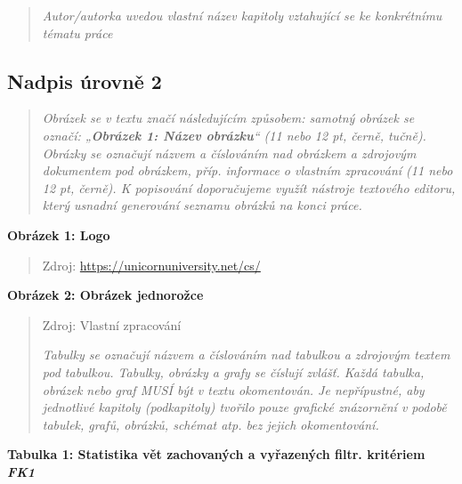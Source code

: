 \documentclass[
]{article}
\begin{document}
\begin{quote}
  \emph{Autor/autorka uvedou vlastní název kapitoly vztahující se ke
    konkrétnímu tématu práce}
\end{quote}

\hypertarget{nadpis-uxfarovnux11b-2-2}{%
  \subsection{Nadpis úrovně 2}\label{nadpis-uxfarovnux11b-2-2}}

\begin{quote}
  \emph{Obrázek se v textu značí následujícím způsobem: samotný obrázek se
    označí: „\textbf{Obrázek 1: Název obrázku}`` (11 nebo 12 pt, černě,
    tučně). Obrázky se označují názvem a číslováním nad obrázkem a zdrojovým
    dokumentem pod obrázkem, příp. informace o vlastním zpracování (11 nebo
    12 pt, černě). K popisování doporučujeme využít nástroje textového
    editoru, který usnadní generování seznamu obrázků na konci práce.}
\end{quote}

\textbf{Obrázek 1: Logo}


\begin{quote}
  Zdroj: \url{https://unicornuniversity.net/cs/}
\end{quote}

\newpage
\textbf{Obrázek 2: Obrázek jednorožce}

\begin{quote}

  Zdroj: Vlastní zpracování

  \emph{Tabulky se označují názvem a číslováním nad tabulkou a zdrojovým
    textem pod tabulkou. Tabulky, obrázky a grafy se číslují zvlášť. Každá
    tabulka, obrázek nebo graf MUSÍ být v textu okomentován. Je nepřípustné,
    aby jednotlivé kapitoly (podkapitoly) tvořilo pouze grafické znázornění
    v podobě tabulek, grafů, obrázků, schémat atp. bez jejich okomentování.}
\end{quote}

\protect\hypertarget{_bookmark9}{}{}\textbf{Tabulka 1: Statistika vět
  zachovaných a vyřazených filtr. kritériem \emph{FK1}}
\end{document}
